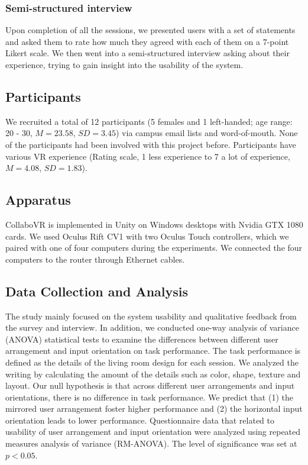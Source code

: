 \documentclass{sigchi}
\begin{document}
\subsubsection{Semi-structured interview}
Upon completion of all the sessions, we presented users with a set of statements and asked them to rate how much they agreed with each of them on a 7-point Likert scale. We then went into a semi-structured interview asking about their experience, trying to gain insight into the usability of the system.

\subsection{Participants}
We recruited a total of 12 participants (5 females and 1 left-handed; age range: 20 - 30, $M=23.58$, $SD=3.45$) via campus email lists and word-of-mouth. None of the participants had been involved with this project before. Participants have various VR experience (Rating scale, 1 less experience to 7 a lot of experience, $M=4.08$, $SD=1.83$).

\subsection{Apparatus}
CollaboVR is implemented in Unity on Windows desktops with Nvidia GTX 1080 cards. We used Oculus Rift CV1 with two Oculus Touch controllers, which we paired with one of four computers during the experiments. We connected the four computers to the router through Ethernet cables.

\subsection{Data Collection and Analysis}
The study mainly focused on the system usability and qualitative feedback from the survey and interview. In addition, we conducted one-way analysis of variance (ANOVA) statistical tests to examine the differences between different user arrangement and input orientation on task performance. The task performance is defined as the details of the living room design for each session. We analyzed the writing by calculating the amount of the details such as color, shape, texture and layout. Our null hypothesis is that across different user arrangements and input orientations, there is no difference in task performance. We predict that (1) the mirrored user arrangement foster higher performance and (2) the horizontal input orientation leads to lower performance. Questionnaire data that related to usability of user arrangement and input orientation were analyzed using repeated measures analysis of variance (RM-ANOVA). The level of significance was set at $p<0.05$.
\end{document}

